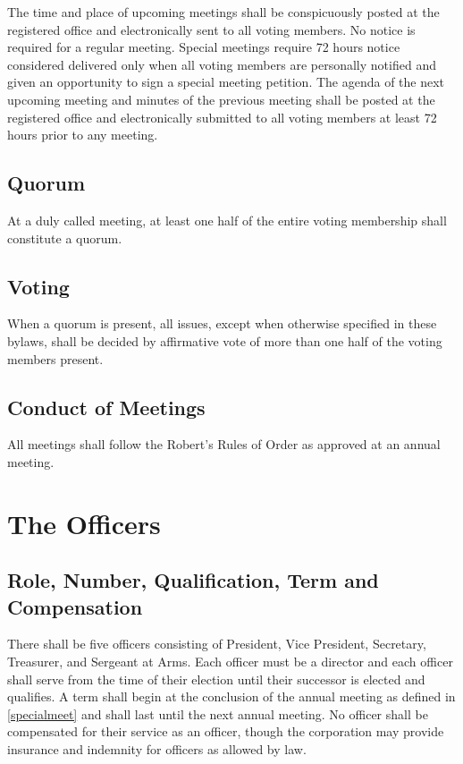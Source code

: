 \documentclass[10pt,letterpaper,titlepage]{article}
\begin{document}
The time and place of upcoming meetings shall be conspicuously posted at the
registered office and electronically sent to all voting members.
No notice is required for a regular meeting.
Special meetings require 72 hours notice considered delivered only when all
voting members are personally notified and given an opportunity to sign a
special meeting petition.
The agenda of the next upcoming meeting and minutes of the previous meeting
shall be posted at the registered office and electronically submitted to all
voting members at least 72 hours prior to any meeting.

\subsection{Quorum}

At a duly called meeting, at least one half of the entire voting
membership shall constitute a quorum.

\subsection{Voting}

When a quorum is present, all issues, except when otherwise specified in these
bylaws, shall be decided by affirmative vote of more than one half of the
voting members present.

\subsection{Conduct of Meetings}
\label{condofmeet}

All meetings shall follow the Robert's Rules of Order as approved at an annual
meeting.


\section{The Officers}
\label{officers}

\subsection{Role, Number, Qualification, Term and Compensation}

There shall be five officers consisting of President, Vice President,
Secretary, Treasurer, and Sergeant at Arms.
Each officer must be a director and each officer shall serve from the time of
their election until their successor is elected and qualifies.
A term shall begin at the conclusion of the annual meeting as defined in
\ref{specialmeet} and shall last until the next annual meeting.
No officer shall be compensated for their service as an officer, though the
corporation may provide insurance and indemnity for officers as allowed by law.
\end{document}
